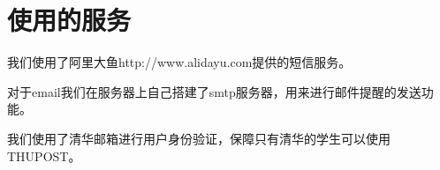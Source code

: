 \section{使用的服务}
我们使用了阿里大鱼http://www.alidayu.com提供的短信服务。

对于email我们在服务器上自己搭建了smtp服务器，用来进行邮件提醒的发送功能。

我们使用了清华邮箱进行用户身份验证，保障只有清华的学生可以使用THUPOST。